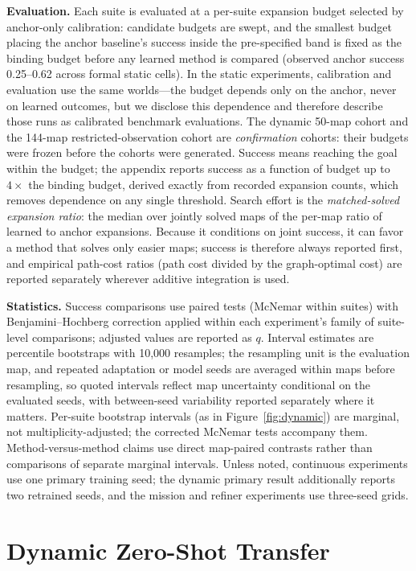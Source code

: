 \documentclass[letterpaper]{article} %
\begin{document}
\textbf{Evaluation.} Each suite is evaluated at a per-suite expansion budget selected by anchor-only calibration: candidate budgets are swept, and the smallest budget placing the anchor baseline's success inside the pre-specified band is fixed as the binding budget before any learned method is compared (observed anchor success 0.25--0.62 across formal static cells). In the static experiments, calibration and evaluation use the same worlds---the budget depends only on the anchor, never on learned outcomes, but we disclose this dependence and therefore describe those runs as calibrated benchmark evaluations. The dynamic 50-map cohort and the 144-map restricted-observation cohort are \emph{confirmation} cohorts: their budgets were frozen before the cohorts were generated. Success means reaching the goal within the budget; the appendix reports success as a function of budget up to $4\times$ the binding budget, derived exactly from recorded expansion counts, which removes dependence on any single threshold. Search effort is the \emph{matched-solved expansion ratio}: the median over jointly solved maps of the per-map ratio of learned to anchor expansions. Because it conditions on joint success, it can favor a method that solves only easier maps; success is therefore always reported first, and empirical path-cost ratios (path cost divided by the graph-optimal cost) are reported separately wherever additive integration is used.

\textbf{Statistics.} Success comparisons use paired tests (McNemar within suites) with Benjamini--Hochberg correction applied within each experiment's family of suite-level comparisons; adjusted values are reported as $q$. Interval estimates are percentile bootstraps with 10{,}000 resamples; the resampling unit is the evaluation map, and repeated adaptation or model seeds are averaged within maps before resampling, so quoted intervals reflect map uncertainty conditional on the evaluated seeds, with between-seed variability reported separately where it matters. Per-suite bootstrap intervals (as in Figure~\ref{fig:dynamic}) are marginal, not multiplicity-adjusted; the corrected McNemar tests accompany them. Method-versus-method claims use direct map-paired contrasts rather than comparisons of separate marginal intervals. Unless noted, continuous experiments use one primary training seed; the dynamic primary result additionally reports two retrained seeds, and the mission and refiner experiments use three-seed grids.

\section{Dynamic Zero-Shot Transfer}
\end{document}
